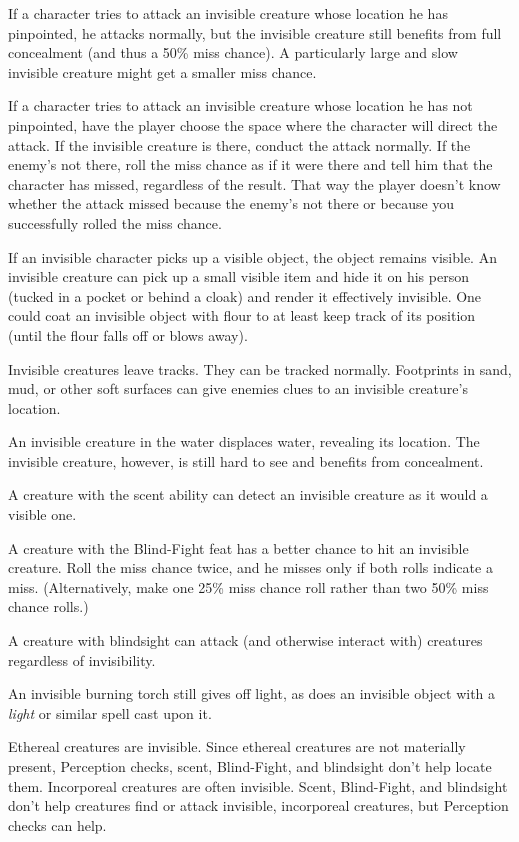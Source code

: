 If a character tries to attack an invisible creature whose location he has pinpointed, he attacks normally, but the invisible creature still benefits from full concealment (and thus a 50\% miss chance). A particularly large and slow invisible creature might get a smaller miss chance.
				
If a character tries to attack an invisible creature whose location he has not pinpointed, have the player choose the space where the character will direct the attack. If the invisible creature is there, conduct the attack normally. If the enemy's not there, roll the miss chance as if it were there and tell him that the character has missed, regardless of the result. That way the player doesn't know whether the attack missed because the enemy's not there or because you successfully rolled the miss chance.
				
If an invisible character picks up a visible object, the object remains visible. An invisible creature can pick up a small visible item and hide it on his person (tucked in a pocket or behind a cloak) and render it effectively invisible. One could coat an invisible object with flour to at least keep track of its position (until the flour falls off or blows away). 
				
Invisible creatures leave tracks. They can be tracked normally. Footprints in sand, mud, or other soft surfaces can give enemies clues to an invisible creature's location.
				
An invisible creature in the water displaces water, revealing its location. The invisible creature, however, is still hard to see and benefits from concealment.
				
A creature with the scent ability can detect an invisible creature as it would a visible one.
				
A creature with the Blind-Fight feat has a better chance to hit an invisible creature. Roll the miss chance twice, and he misses only if both rolls indicate a miss. (Alternatively, make one 25\% miss chance roll rather than two 50\% miss chance rolls.)
				
A creature with blindsight can attack (and otherwise interact with) creatures regardless of invisibility.
				
An invisible burning torch still gives off light, as does an invisible object with a \textit{light} or similar spell cast upon it.
				
Ethereal creatures are invisible. Since ethereal creatures are not materially present, Perception checks, scent, Blind-Fight, and blindsight don't help locate them. Incorporeal creatures are often invisible. Scent, Blind-Fight, and blindsight don't help creatures find or attack invisible, incorporeal creatures, but Perception checks can help.
				
